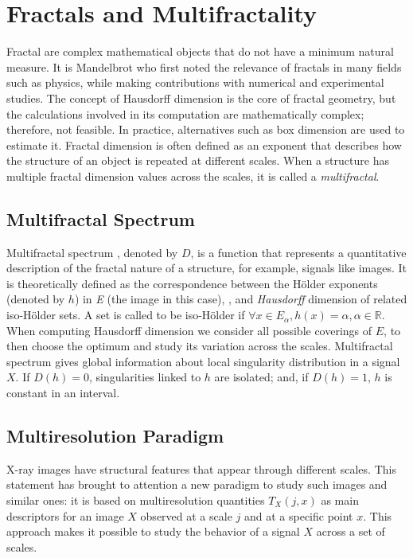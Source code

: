 \documentclass{article}
\begin{document}
\section{Fractals and Multifractality}\label{section_2}
	Fractal are complex mathematical objects that do not have a minimum natural measure. It is Mandelbrot \citep{mandelbrot1982fractal} who first noted the relevance of fractals in many fields such as physics, while making contributions with numerical and experimental studies. The concept of Hausdorff dimension is the core of fractal geometry, but the calculations involved in its computation are mathematically complex; therefore, not feasible. In practice, alternatives such as box dimension \citep{LIEBOVITCH1989386} are used to estimate it. Fractal dimension is often defined as an exponent that describes how the structure of an object is repeated at different scales. When a structure has multiple fractal dimension values across the scales, it is called a \textit{multifractal}.  


	\subsection{Multifractal Spectrum} \label{multifractal_spectrum}
	Multifractal spectrum \citep{multifractalspectrum}, denoted by $D$,  is a function that represents a quantitative description of the fractal nature of a structure, for example, signals like images. It is theoretically defined as the correspondence between the H\"older exponents (denoted by $h$) in \textit{E} (the image in this case), \citep{article}, and \textit{Hausdorff} dimension of related iso-H\"older sets. A set is called to be iso-H\"older if $\forall x \in E_{\alpha}, h(x)={\alpha}, \alpha \in \mathbb{R}$. When computing Hausdorff dimension we consider all possible coverings of $E$, to then choose the optimum and study its variation across the scales. 
Multifractal spectrum gives global information about local singularity distribution in a signal $X$. If $D(h)=0$, singularities linked to $h$ are isolated; and, if $D(h)=1$, $h$ is constant in an interval. 

	\subsection{Multiresolution Paradigm}

X-ray images have structural features that appear through different scales. This statement has brought to attention a new paradigm to study such images and similar ones: it is based on multiresolution quantities $T_X(j, x)$ as main descriptors for an image $X$ observed at a scale $j$ and at a specific point $x$. This approach makes it possible to study the behavior of a signal $X$ across a set of scales.  
\end{document}
